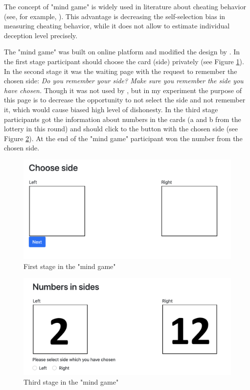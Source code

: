 \documentclass[12pt]{article}
\begin{document}
	The concept of "mind game" is widely used in literature about cheating behavior (see, for example, \cite{jiang2013cheating,  zimerman2014self, abeler2019preferences, mol2020not}). This advantage is decreasing the self-selection bias in measuring cheating behavior, while it does not allow to estimate individual deception level precisely.
	
	The "mind game" was built on online platform and modified the design by \cite{mol2020not}. In the first stage participant should choose the card (side) privately (see Figure \ref{firststage}). In the second stage it was the waiting page with the request to remember the chosen side: 
	\textit{Do you remember your side? Make sure you remember the side you have chosen.} Though it was not used by \cite{jiang2013cheating, mol2020not}, but in my experiment the purpose of this page is to decrease the opportunity to not select the side and not remember it, which would cause biased high level of dishonesty.
	In the third stage participants got the information about numbers in the cards (a and b from the lottery in this round) and should click to the button with the chosen side (see Figure \ref{thirdstage}). At the end of the "mind game" participant won the number from the chosen side.
	
	\begin{figure}[!h]
		\caption{First stage in the "mind game"}
		\label{firststage}
		\includegraphics[scale=0.42]{first_stage.png}
	\end{figure}
	
	\begin{figure}[!h]
		\caption{Third stage in the "mind game"}
		\label{thirdstage}
		\includegraphics[scale=0.42]{third_stage.png}
	\end{figure}
	
\end{document}
